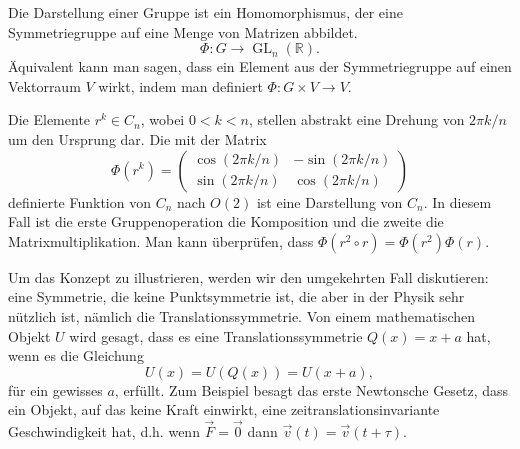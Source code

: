 \begin{definition}
	Die Darstellung einer Gruppe ist ein Homomorphismus, der eine Symmetriegruppe
	auf eine Menge von Matrizen abbildet.
	\[
		\Phi: G \to \operatorname{GL}_n(\mathbb{R}).
	\]
	Äquivalent kann man sagen, dass ein Element aus der Symmetriegruppe auf einen
	Vektorraum \(V\) wirkt, indem man definiert \(\Phi : G \times V \to V\).
\end{definition}
\begin{beispiel}
	Die Elemente \(r^k \in C_n\), wobei \(0 < k < n\), stellen abstrakt eine
	Drehung von \(2\pi k/n\) um den Ursprung dar. Die mit der Matrix 
	\[
		\Phi(r^k) = \begin{pmatrix}
			\cos(2\pi k/n) & -\sin(2\pi k/n) \\
			\sin(2\pi k/n) &  \cos(2\pi k/n)
		\end{pmatrix}
	\]
	definierte Funktion von \(C_n\) nach \(O(2)\) ist eine Darstellung von
	\(C_n\). In diesem Fall ist die erste Gruppenoperation die Komposition und
	die zweite die Matrixmultiplikation. Man kann überprüfen, dass \(\Phi(r^2
	\circ r) = \Phi(r^2)\Phi(r)\).
\end{beispiel}

Um das Konzept zu illustrieren, werden wir den umgekehrten Fall diskutieren:
eine Symmetrie, die keine Punktsymmetrie ist, die aber in der Physik sehr
nützlich ist, nämlich die Translationssymmetrie.  Von einem mathematischen
Objekt \(U\) wird gesagt, dass es eine Translationssymmetrie \(Q(x) = x + a\)
hat, wenn es die Gleichung 
\[
	U(x) = U(Q(x)) = U(x + a),
\]
für ein gewisses \(a\), erfüllt. Zum Beispiel besagt das erste Newtonsche
Gesetz, dass ein Objekt, auf das keine Kraft einwirkt, eine
zeitranslationsinvariante Geschwindigkeit hat, d.h. wenn \(\vec{F} = \vec{0}\)
dann \(\vec{v}(t) = \vec{v}(t + \tau)\).



